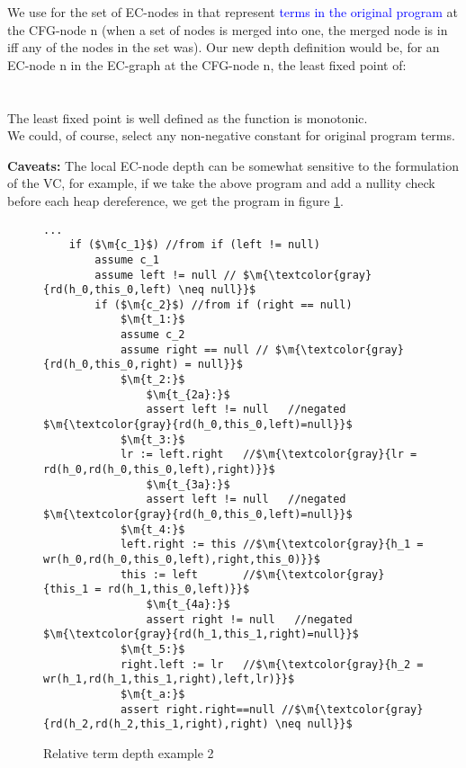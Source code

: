 We use \textcolor{blue}{} for the set of EC-nodes in  that represent \textcolor{blue}{terms in the original program} at the CFG-node n
(when a set of nodes is merged into one, the merged node is in  iff any of the nodes in the set was).
Our new depth definition would be, for an EC-node n in the EC-graph  at the CFG-node n, the least fixed point of:\\
\\
\\
The least fixed point is well defined as the function is monotonic.\\
We could, of course, select any non-negative constant for original program terms.

\textbf{Caveats:}
The local EC-node depth can be somewhat sensitive to the formulation of the VC, for example, if we take the above program and add a nullity check before each heap dereference, we get the program in figure \ref{snippet4.3}.

\begin{figure}
\begin{lstlisting}[tabsize=1]
		...
	if ($\m{c_1}$) //from if (left != null)  
		assume c_1
		assume left != null // $\m{\textcolor{gray}{rd(h_0,this_0,left) \neq null}}$
		if ($\m{c_2}$) //from if (right == null)  
			$\m{t_1:}$
			assume c_2
			assume right == null // $\m{\textcolor{gray}{rd(h_0,this_0,right) = null}}$
			$\m{t_2:}$
				$\m{t_{2a}:}$
				assert left != null   //negated $\m{\textcolor{gray}{rd(h_0,this_0,left)=null}}$
			$\m{t_3:}$
			lr := left.right   //$\m{\textcolor{gray}{lr = rd(h_0,rd(h_0,this_0,left),right)}}$
				$\m{t_{3a}:}$
				assert left != null   //negated $\m{\textcolor{gray}{rd(h_0,this_0,left)=null}}$
			$\m{t_4:}$
			left.right := this //$\m{\textcolor{gray}{h_1 = wr(h_0,rd(h_0,this_0,left),right,this_0)}}$
			this := left       //$\m{\textcolor{gray}{this_1 = rd(h_1,this_0,left)}}$
				$\m{t_{4a}:}$
				assert right != null   //negated $\m{\textcolor{gray}{rd(h_1,this_1,right)=null}}$
			$\m{t_5:}$
			right.left := lr   //$\m{\textcolor{gray}{h_2 = wr(h_1,rd(h_1,this_1,right),left,lr)}}$
			$\m{t_a:}$
			assert right.right==null //$\m{\textcolor{gray}{rd(h_2,rd(h_2,this_1,right),right) \neq null}}$
\end{lstlisting}
\caption{Relative term depth example 2}
\label{snippet4.3}
\end{figure}

